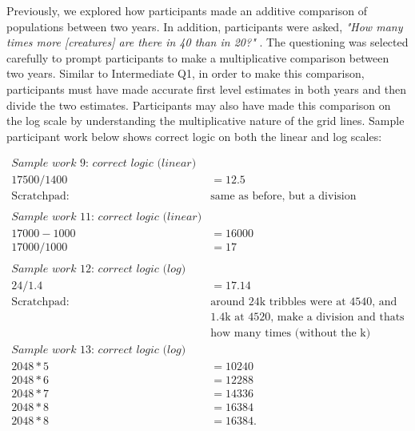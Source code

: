 \documentclass[print]{nuthesis}
\begin{document}
Previously, we explored how participants made an additive comparison of populations between two years.
In addition, participants were asked, \textit{"How many times more [creatures] are there in 40 than in 20?"} .
The questioning was selected carefully to prompt participants to make a multiplicative comparison between two years.
Similar to Intermediate Q1, in order to make this comparison, participants must have made accurate first level estimates in both years and then divide the two estimates.
Participants may also have made this comparison on the log scale by understanding the multiplicative nature of the grid lines. Sample participant work below shows correct logic on both the linear and log scales:

\begin{align}
\textit{Sample work 9: correct logic (linear)} \nonumber\\
17500/1400&=12.5 \nonumber\\    
\text{Scratchpad: } & \text{same as before, but a division} \nonumber\\
\nonumber \\
\textit{Sample work 11: correct logic (linear)} \nonumber\\
17000-1000&=16000 \nonumber\\
17000/1000&=17  \nonumber\\
\nonumber \\
\textit{Sample work 12: correct logic (log)} \nonumber\\
24/1.4&=17.14    \nonumber\\ 
\text{Scratchpad: } & \text{around 24k tribbles were at 4540, and} \nonumber\\
                   & \text{1.4k at 4520, make a division and thats}\nonumber\\
                   & \text{how many times (without the k)}\nonumber
\nonumber \\
\textit{Sample work 13: correct logic (log)} \nonumber\\                   
2048*5&=10240 \nonumber\\   
2048*6&=12288 \nonumber\\   
2048*7&=14336 \nonumber\\   
2048*8&=16384  \nonumber\\   
2048*8&=16384. \nonumber
\end{align}
\end{document}
